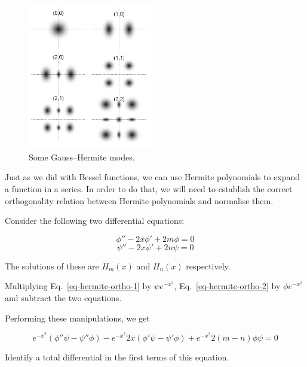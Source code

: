\begin{figure}
\centering
\includegraphics[width=5.5cm]{hermite/figures/gauss}
\caption{Some Gauss--Hermite modes.}
\label{fig-gauss-hermite}
\end{figure}


\pagebreak



Just as we did with Bessel functions, we can use Hermite polynomials to expand a function in a series. In order to do that, we will need to establish the correct orthogonality relation between Hermite polynomials and normalise them.

Consider the following two differential equations:

\begin{equation}
\phi'' - 2 x \phi' + 2m \phi = 0 \label{eq-hermite-ortho-1}
\end{equation}
\begin{equation}
\psi'' - 2 x \psi' + 2n \psi = 0 \label{eq-hermite-ortho-2}
\end{equation}

The solutions of these are $H_m(x)$ and $H_n(x)$ respectively.

\begin{cue}
Multiplying Eq.~\ref{eq-hermite-ortho-1} by $\psi e^{-x^2}$, Eq.~\ref{eq-hermite-ortho-2} by $\phi e^{-x^2}$ and subtract the two equations.
\end{cue}

Performing these manipulations, we get

\begin{equation}
e^{-x^2}\left(\phi''\psi -\psi''\phi\right)- e^{-x^2} 2 x \left(\phi'\psi -\psi'\phi\right)+ e^{-x^2}2(m-n)\phi\psi = 0
\end{equation} 

\begin{cue}
Identify a total differential in the first terms of this equation.
\end{cue}

